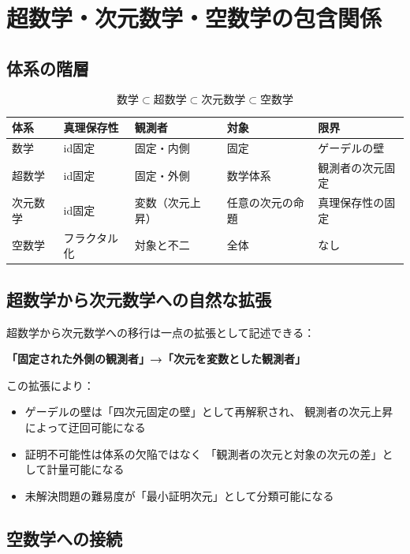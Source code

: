 \documentclass[11pt,a4paper]{article}
\theoremstyle{definition}
\begin{document}
\section{超数学・次元数学・空数学の包含関係}

\subsection{体系の階層}

\[
\text{数学} \subset \text{超数学} \subset \text{次元数学} \subset \text{空数学}
\]

\begin{center}
\begin{tabular}{lllll}
\toprule
体系 & 真理保存性 & 観測者 & 対象 & 限界 \\
\midrule
数学 & id固定 & 固定・内側 & 固定 & ゲーデルの壁 \\
超数学 & id固定 & 固定・外側 & 数学体系 & 観測者の次元固定 \\
次元数学 & id固定 & 変数（次元上昇） & 任意の次元の命題 & 真理保存性の固定 \\
空数学 & フラクタル化 & 対象と不二 & 全体 & なし \\
\bottomrule
\end{tabular}
\end{center}

\subsection{超数学から次元数学への自然な拡張}

超数学から次元数学への移行は一点の拡張として記述できる：

\begin{center}
\textbf{「固定された外側の観測者」→「次元を変数とした観測者」}
\end{center}

この拡張により：

\begin{itemize}
\item ゲーデルの壁は「四次元固定の壁」として再解釈され、
  観測者の次元上昇によって迂回可能になる
\item 証明不可能性は体系の欠陥ではなく
  「観測者の次元と対象の次元の差」として計量可能になる
\item 未解決問題の難易度が「最小証明次元」として分類可能になる
\end{itemize}

\subsection{空数学への接続}
\end{document}
